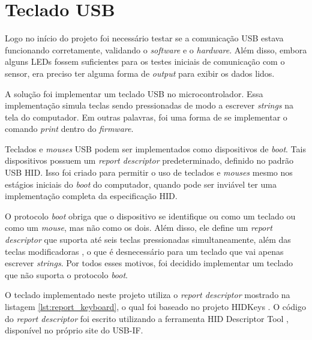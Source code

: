\documentclass[brazil,pagestart=firstchapter]{abnt}
\begin{document}
\section{Teclado USB}
\label{sec:keyboard}

Logo no início do projeto foi necessário testar se a comunicação \ac{USB}
estava funcionando corretamente, validando o \textit{software} e o
\textit{hardware}. Além disso, embora alguns \acp{LED} fossem suficientes
para os testes iniciais de comunicação com o sensor, era preciso ter alguma
forma de \textit{output} para exibir os dados lidos.

A solução foi implementar um teclado \ac{USB} no microcontrolador. Essa
implementação simula teclas sendo pressionadas de modo a escrever
\textit{strings} na tela do computador. Em outras palavras, foi uma forma de
se implementar o comando \textit{print} dentro do \textit{firmware}.

Teclados e \textit{mouses} \ac{USB} podem ser implementados como
dispositivos de \textit{boot}. Tais dispositivos possuem um \textit{report
descriptor} predeterminado, definido no padrão \ac{USB} \ac{HID}. Isso foi
criado para permitir o uso de teclados e \textit{mouses} mesmo nos estágios
iniciais do \textit{boot} do computador, quando pode ser inviável ter uma
implementação completa da especificação \ac{HID}. \cite[p.~59]{usbhid}

O protocolo \textit{boot} obriga que o dispositivo se identifique ou como um
teclado ou como um \textit{mouse}, mas não como os dois. \cite[p.~9]{usbhid}
Além disso, ele define um \textit{report descriptor} que suporta até seis
teclas pressionadas simultaneamente, além das teclas modificadoras
\cite[p.~60]{usbhid}, o que é desnecessário para um teclado que vai apenas
escrever \textit{strings}. Por todos esses motivos, foi decidido implementar
um teclado que não suporta o protocolo \textit{boot}.

O teclado implementado neste projeto utiliza o \textit{report descriptor}
mostrado na listagem \ref{lst:report_keyboard}, o qual foi baseado no
projeto HIDKeys \cite{HIDKeys}. O código do \textit{report descriptor} foi
escrito utilizando a ferramenta HID Descriptor Tool \cite{hiddt}, disponível
no próprio site do \ac{USB-IF}.
\end{document}
